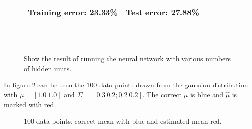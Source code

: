 \begin{figure}[!htbp]
{\begin{tabular}{|c|c|}
      Training error: 23.33\% & Test error: 27.88\% \\
      \hline
    \end{tabular}
  } \\
   \\
  \caption{Show the result of running the neural network with various numbers of hidden units.}
  \label{fig:q210hidden}
\end{figure}



%


%






In figure \ref{fig:q1_1} can be seen the $100$ data points drawn from
the gaussian distribution with $\mu = [1.0~ 1.0]$ and $\Sigma = [0.3~
  0.2; 0.2~ 0.2]$. The correct $\mu$ is blue and $\widehat{\mu}$ is
marked with red.

\begin{figure}[!htpb]
  \centering
  \caption{100 data points, correct mean with blue and estimated mean red.}
  \label{fig:q1_1}
\end{figure}

